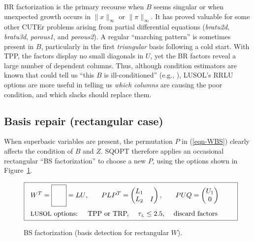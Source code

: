 \documentclass[draft,leqno,onefignum,onetabnum]{siamltex}
\def\norm#1{\|#1\|}
\def\Lmax{\hbox{$\tau_{\scriptscriptstyle L}$}}  %
\def\CUTEr {{\small CUTEr}}
\def\LUSOL {{\small LUSOL}}
\def\SQOPT {{\small SQOPT}}
\def\Cute#1{\hbox{\it\lowercase{#1}\/}}
\newcommand{\pmat}[1]{\begin{pmatrix}#1\end{pmatrix}}
\newcommand{\infnorm}[1]{\norm{#1}_{\infty}}
\begin{document}
BR factorization is the primary recourse when $B$ seems singular
or when unexpected growth occurs in $\infnorm{x}$ or $\infnorm{\pi}$.
It has proved valuable for some other \CUTEr{} problems
arising from partial differential equations
(\Cute{BRATU2D}, \Cute{BRATU3D}, \Cute{POROUS1}, and \Cute{POROUS2}).
A regular ``marching pattern'' is sometimes present in $B$, particularly
in the first \emph{triangular} basis following a cold start.
With TPP, the factors display no small diagonals in $U$,
yet the BR factors reveal a large number of dependent columns.
%
%
Thus, although condition estimators are known that could tell us
``this $B$ is ill-conditioned'' (e.g., \cite{Hig88}),
\LUSOL's RRLU options are more useful in telling us
\emph{which columns} are causing the poor condition,
and which slacks should replace them.


\subsection{Basis repair (rectangular case)}    \label{sec-BSfac}

When superbasic variables are present,
the permutation $P$ in (\ref{eqn-WBS}) clearly affects
the condition of $B$ and $Z$.
\SQOPT{} therefore applies an occasional rectangular ``BS factorization''
to choose a new $P$, using the options shown in Figure~\ref{fig-BS}.

\begin{figure}[t]
 $$
 \fbox{\begin{tabular}{l@{\qquad}l@{\qquad}l}
       $W^T = \raisebox{-10pt}{\fbox{\phantom{\rule{15pt}{25pt}}}} = LU$,
                    & $ PLP^T = \pmat{L_1 \\ L_2 & I}, $
                    & $ PUQ   = \pmat{U_1 \\ 0} $ \phantom{$U_2$}
       \\[15pt]
         \rlap{\LUSOL{} options: \quad TPP or TRP,
                                \quad $\Lmax \le 2.5$,
                                \quad discard factors}
       \end{tabular}
      }
 $$
 \caption{BS factorization (basis detection for rectangular $W$).}
 \label{fig-BS}
\end{figure}
\end{document}
